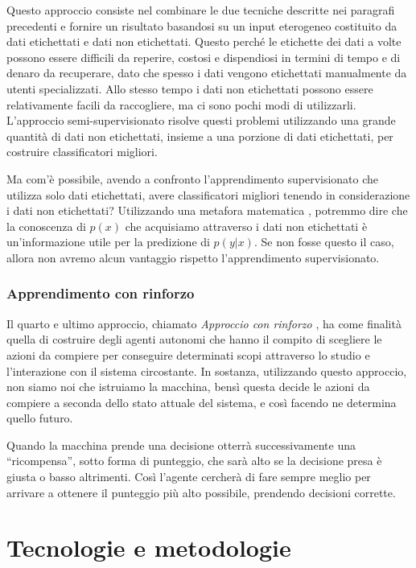 \documentclass[a4paper,12pt]{report}
\begin{document}
Questo approccio consiste nel combinare le due tecniche descritte nei paragrafi precedenti e fornire un risultato basandosi su un input eterogeneo costituito da dati etichettati e dati non etichettati.
Questo perché le etichette dei dati a volte possono essere difficili da reperire, costosi e dispendiosi in termini di tempo e di denaro da recuperare, dato che spesso i dati vengono etichettati manualmente da utenti specializzati. Allo stesso tempo i dati non etichettati possono essere relativamente facili da raccogliere, ma ci sono pochi modi di utilizzarli. 
L'approccio semi-supervisionato risolve questi problemi utilizzando una grande quantità di dati non etichettati, insieme a una porzione di dati etichettati, per costruire classificatori migliori. 

Ma com'è possibile, avendo a confronto l'apprendimento supervisionato che utilizza solo dati etichettati, avere classificatori migliori tenendo in considerazione i dati non etichettati?
Utilizzando una metafora matematica \cite{supervisedlearning}, potremmo dire che la conoscenza di $p(x)$ che acquisiamo attraverso i dati non etichettati è un'informazione utile per la predizione di $p(y|x)$. Se non fosse questo il caso, allora non avremo alcun vantaggio rispetto l'apprendimento supervisionato.

\subsection*{Apprendimento con rinforzo}
Il quarto e ultimo approccio, chiamato \textit{Approccio con rinforzo} \cite{Reinforcement_learning}, ha come finalità quella di costruire degli agenti autonomi che hanno il compito di scegliere le azioni da compiere per conseguire determinati scopi attraverso lo studio e l'interazione con il sistema circostante.
In sostanza, utilizzando questo approccio, non siamo noi che istruiamo la macchina, bensì questa decide le azioni da compiere a seconda dello stato attuale del sistema, e così facendo ne determina quello futuro.

Quando la macchina prende una decisione otterrà successivamente una “ricompensa”, sotto forma di punteggio, che sarà alto se la decisione presa è giusta o basso altrimenti. Così l'agente cercherà di fare sempre meglio per arrivare a ottenere il punteggio più alto possibile, prendendo decisioni corrette.

\chapter{Tecnologie e metodologie}
\label{Capitolo 2}
\end{document}
